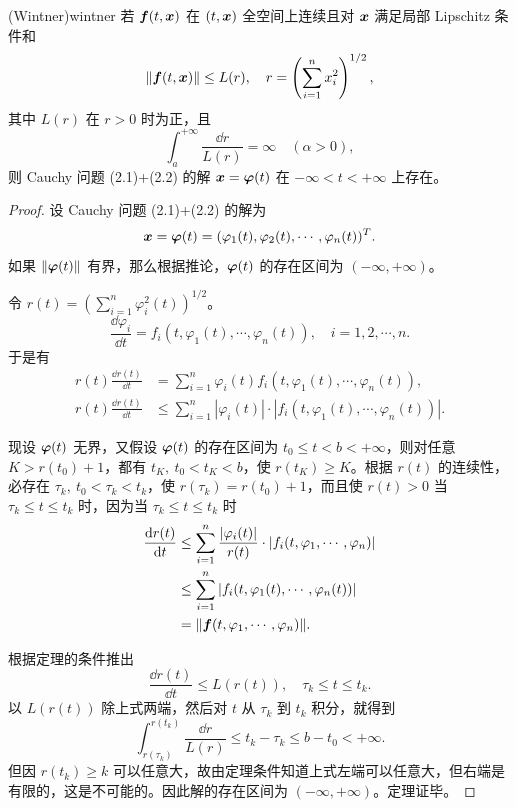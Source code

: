 \begin{theorem}{(Wintner)}{wintner}
若 $\boldsymbol{f}(t, \boldsymbol{x})$ 在 $(t, \boldsymbol{x})$ 全空间上连续且对 $\boldsymbol{x}$ 满足局部 Lipschitz 条件和
\[
\|\boldsymbol{f}(t, \boldsymbol{x})\| \leq L(r), \quad r = \left(\sum_{i=1}^n x_i^2\right)^{1/2},
\]
其中 $L(r)$ 在 $r > 0$ 时为正，且
\begin{equation}
\int_a^{+\infty} \frac{\dd r}{L(r)} = \infty \quad (\alpha > 0), \tag{2.5}
\end{equation}
则 Cauchy 问题 (2.1)+(2.2) 的解 $\boldsymbol{x} = \boldsymbol{\varphi}(t)$ 在 $-\infty < t < +\infty$ 上存在。
\end{theorem}

\begin{proof}
设 Cauchy 问题 (2.1)+(2.2) 的解为
\[
\boldsymbol{x} = \boldsymbol{\varphi}(t) = (\varphi_1(t), \varphi_2(t), \cdots, \varphi_n(t))^T.
\]
如果 $\|\boldsymbol{\varphi}(t)\|$ 有界，那么根据推论，$\boldsymbol{\varphi}(t)$ 的存在区间为 $(-\infty, +\infty)$。

令 $r(t) = \left(\sum_{i=1}^n \varphi_i^2(t)\right)^{1/2}$。
\[
\frac{\dd \varphi_i}{\dd t} = f_i(t, \varphi_1(t), \cdots, \varphi_n(t)), \quad i = 1, 2, \cdots, n.
\]
于是有
\begin{align*}
	r(t)\frac{\dd r(t)}{\dd t} &= \sum_{i=1}^n \varphi_i(t) f_i(t, \varphi_1(t), \cdots, \varphi_n(t)),\\
	r(t)\frac{\dd r(t)}{\dd t} &\leq \sum_{i=1}^n |\varphi_i(t)| \cdot |f_i(t, \varphi_1(t), \cdots, \varphi_n(t))|.
\end{align*}

现设 $\boldsymbol{\varphi}(t)$ 无界，又假设 $\boldsymbol{\varphi}(t)$ 的存在区间为 $t_0 \leq t < b < +\infty$，则对任意 $K > r(t_0) + 1$，都有 $t_K,\ t_0 < t_K < b$，使 $r(t_K) \geq K$。根据 $r(t)$ 的连续性，必存在 $\tau_k,\ t_0 < \tau_k < t_k$，使 $r(\tau_k) = r(t_0) + 1$，而且使 $r(t) > 0$ 当 $\tau_k \leq t \leq t_k$ 时，因为当 $\tau_k \leq t \leq t_k$ 时
\begin{align*}
\frac{\mathrm{d} r(t)}{\mathrm{d} t} &\leq \sum_{i=1}^n \frac{|\varphi_i(t)|}{r(t)} \cdot |f_i(t, \varphi_1, \cdots, \varphi_n)|\\
&\leq \sum_{i=1}^n |f_i(t, \varphi_1(t), \cdots, \varphi_n(t))|\\
&= \|\boldsymbol{f}(t, \varphi_1, \cdots, \varphi_n)\|.
\end{align*}

根据定理的条件推出
\[
\frac{\dd r(t)}{\dd t} \leq L(r(t)), \quad \tau_k \leq t \leq t_k.
\]
以 $L(r(t))$ 除上式两端，然后对 $t$ 从 $\tau_k$ 到 $t_k$ 积分，就得到
\[
\int_{r(\tau_k)}^{r(t_k)} \frac{\dd r}{L(r)} \leq t_k - \tau_k \leq b - t_0 < +\infty.
\]
但因 $r(t_k) \geq k$ 可以任意大，故由定理条件知道上式左端可以任意大，但右端是有限的，这是不可能的。因此解的存在区间为 $(-\infty, +\infty)$。定理证毕。
\end{proof}

